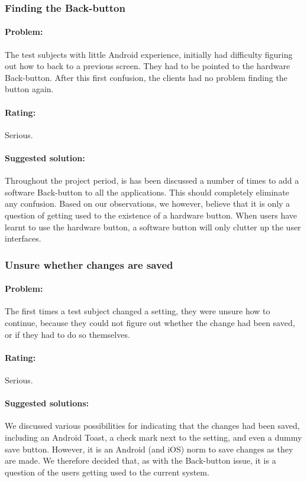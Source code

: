 \subsubsection{Finding the Back-button}

\paragraph{Problem:} The test subjects with little Android experience, initially had difficulty figuring out how to back to a previous screen. They had to be pointed to the hardware Back-button. After this first confusion, the clients had no problem finding the button again.
\paragraph{Rating:} Serious.
\paragraph{Suggested solution:} Throughout the project period, is has been discussed a number of times to add a software Back-button to all the \giraf applications. This should completely eliminate any confusion. Based on our observations, we however, believe that it is only a question of getting used to the existence of a hardware button. When users have learnt to use the hardware button, a software button will only clutter up the user interfaces.

\subsubsection{Unsure whether changes are saved}

\paragraph{Problem:} The first times a test subject changed a setting, they were unsure how to continue, because they could not figure out whether the change had been saved, or if they had to do so themselves.
\paragraph{Rating:} Serious.
\paragraph{Suggested solutions:} We discussed various possibilities for indicating that the changes had been saved, including an Android Toast, a check mark next to the setting, and even a dummy save button. However, it is an Android (and iOS) norm to save changes as they are made. We therefore decided that, as with the Back-button issue, it is a question of the users getting used to the current system.


